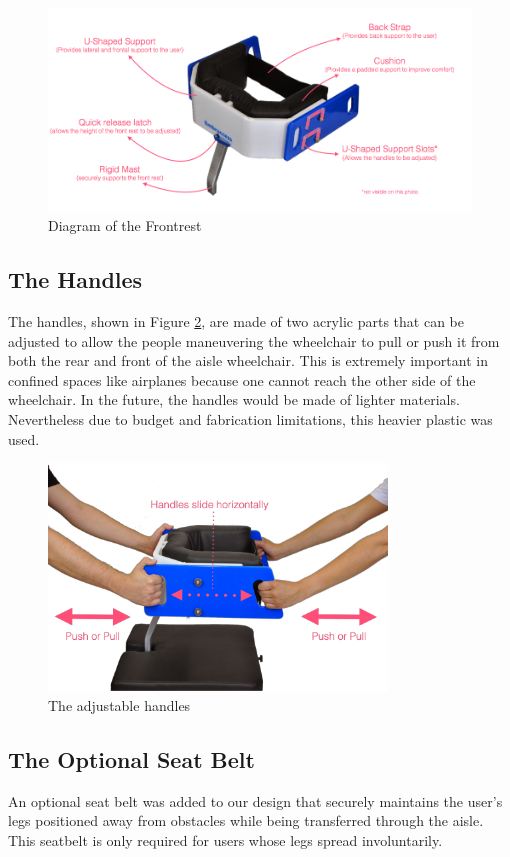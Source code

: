 \begin{figure}[h]
\centering
\includegraphics[width=13cm]{images/AisleWheelchair6.png}
\caption{Diagram of the Frontrest}
\label{fig:frontrest}
\end{figure}

\subsection{The Handles}
The handles, shown in Figure \ref{fig:handles}, are made of two acrylic parts that can be adjusted to allow the people maneuvering the wheelchair to pull or push it from both the rear and front of the aisle wheelchair. This is extremely important in confined spaces like airplanes because one cannot reach the other side of the wheelchair. In the future,  the handles would be made of  lighter materials. Nevertheless due to budget and fabrication limitations, this heavier plastic was used.


\begin{figure}[h]
\centering
\includegraphics[width=9cm]{images/AisleWheelchair7.png}
\caption{The adjustable handles}
\label{fig:handles}
\end{figure}

\subsection{The Optional Seat Belt}
An optional seat belt was added to our design that securely maintains the user's legs positioned away from obstacles while being transferred through the aisle. This seatbelt is only required for users whose legs spread involuntarily.

